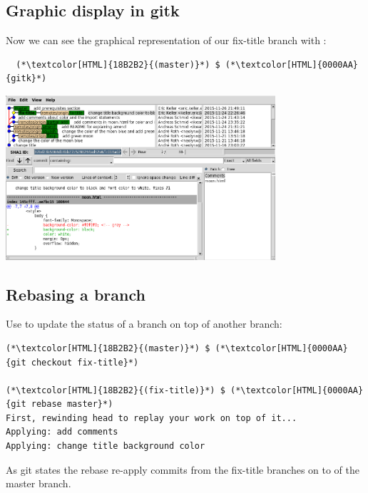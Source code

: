 \subsection{Graphic display in gitk}
\begin{frame}[fragile]
  \subslidetitle

  Now we can see the graphical representation of our fix-title branch with :
  \begin{lstlisting}
  (*\textcolor[HTML]{18B2B2}{(master)}*) $ (*\textcolor[HTML]{0000AA}{gitk}*)
\end{lstlisting}

  \vspace{1em}

  \centerline{\includegraphics[width=10cm]{../screen/gitk-fix-title.png}}

\end{frame}

\subsection{Rebasing a branch}
\begin{frame}[fragile]
  \subslidetitle

  Use  to update the status of a branch on top of another branch:

  \begin{lstlisting}
(*\textcolor[HTML]{18B2B2}{(master)}*) $ (*\textcolor[HTML]{0000AA}{git checkout fix-title}*)

(*\textcolor[HTML]{18B2B2}{(fix-title)}*) $ (*\textcolor[HTML]{0000AA}{git rebase master}*)
First, rewinding head to replay your work on top of it...
Applying: add comments
Applying: change title background color
\end{lstlisting}

  As git states the rebase re-apply commits from the fix-title branches on to of the master branch.

\end{frame}

